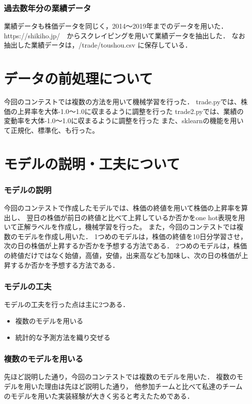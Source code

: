 \documentclass{jsarticle}
\begin{document}
\subsubsection{過去数年分の業績データ}
業績データも株価データを同じく，2014〜2019年までのデータを用いた．
https:\slash{}\slash{}shikiho.jp\slash　からスクレイピングを用いて業績データを抽出した．
なお抽出した業績データは，\slash{}trade\slash{}toushou.csv に保存している．

\section{データの前処理について}
今回のコンテストでは複数の方法を用いて機械学習を行った．
trade.pyでは、株価の上昇率を大体-1.0〜1.0に収まるように調整を行った
trade2.pyでは、業績の変動率を大体-1.0〜1.0に収まるように調整を行った
また、sklearnの機能を用いて正規化、標準化、も行った。

\section{モデルの説明・工夫について}

\subsubsection{モデルの説明}
今回のコンテストで作成したモデルでは、株価の終値を用いて株価の上昇率を算出し、
翌日の株価が前日の終値と比べて上昇しているか否かをone hot表現を用いて正解ラベルを作成し，機械学習を行った。
また，今回のコンテストでは複数のモデルを作成し用いた．
1つめのモデルは，株価の終値を10日分学習させ，次の日の株価が上昇するか否かを予想する方法である．
2つめのモデルは，株価の終値だけではなく始値，高値，安値，出来高なども加味し、次の日の株価が上昇するか否かを予想する方法である．

\subsubsection{モデルの工夫}
モデルの工夫を行った点は主に2つある．
\begin{itemize}
\item 複数のモデルを用いる
\item 統計的な予測方法を織り交ぜる
\end{itemize}

\subsubsection{複数のモデルを用いる}
先ほど説明した通り，今回のコンテストでは複数のモデルを用いた．
複数のモデルを用いた理由は先ほど説明した通り，
他参加チームと比べて私達のチームのモデルを用いた実装経験が大きく劣ると考えたためである．
\end{document}
